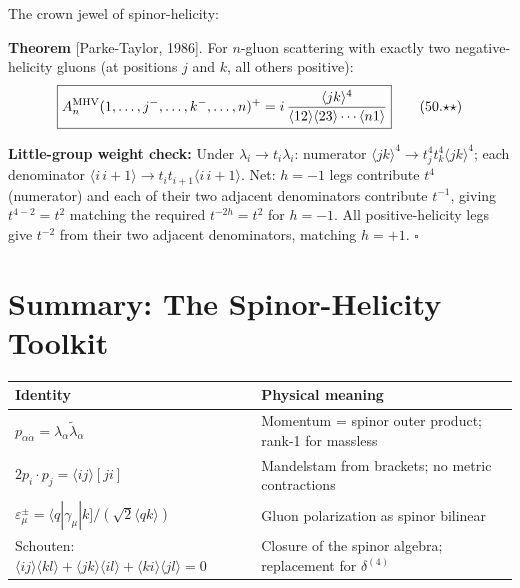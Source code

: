 The crown jewel of spinor-helicity:

\begin{mdframed}[backgroundcolor=red!5]
\textbf{Theorem} [Parke-Taylor, 1986].
For $n$-gluon scattering with exactly two negative-helicity gluons
(at positions $j$ and $k$, all others positive):
\begin{equation}
\boxed{%
A_n^{\rm MHV}(1,\ldots,j^-,\ldots,k^-,\ldots,n)^+
= i\,\frac{\langle jk\rangle^4}
{\langle12\rangle\langle23\rangle\cdots\langle n1\rangle}
}
\tag{50.$\star\star$}
\end{equation}
\end{mdframed}

\textbf{Little-group weight check:} Under $\lambda_i\to t_i\lambda_i$:
numerator $\langle jk\rangle^4\to t_j^4t_k^4\langle jk\rangle^4$;
each denominator $\langle i\,i+1\rangle\to t_i t_{i+1}\langle i\,i+1\rangle$.
Net: $h=-1$ legs contribute $t^4$ (numerator) and each of their two
adjacent denominators contribute $t^{-1}$, giving $t^{4-2}=t^2$ matching
the required $t^{-2h}=t^2$ for $h=-1$.  All positive-helicity legs
give $t^{-2}$ from their two adjacent denominators, matching $h=+1$.  $\square$

\section{Summary: The Spinor-Helicity Toolkit}

\begin{center}
\begin{tabular}{|p{}|p{}|}
\hline
\textbf{Identity} & \textbf{Physical meaning} \\
\hline
$p_{\alpha\dot\alpha}=\lambda_\alpha\tilde\lambda_{\dot\alpha}$ &
Momentum = spinor outer product; rank-1 for massless \\
\hline
$2p_i\cdot p_j=\langle ij\rangle[ji]$ &
Mandelstam from brackets; no metric contractions \\
\hline
$\varepsilon^\pm_\mu=\langle q|\gamma_\mu|k]/(\sqrt2\langle qk\rangle)$ &
Gluon polarization as spinor bilinear \\
\hline
Schouten: $\langle ij\rangle\langle kl\rangle+\langle jk\rangle\langle il\rangle+\langle ki\rangle\langle jl\rangle=0$ &
Closure of the spinor algebra; replacement for $\delta^{(4)}$ \\
\hline
\end{tabular}
\end{center}

\vfill

